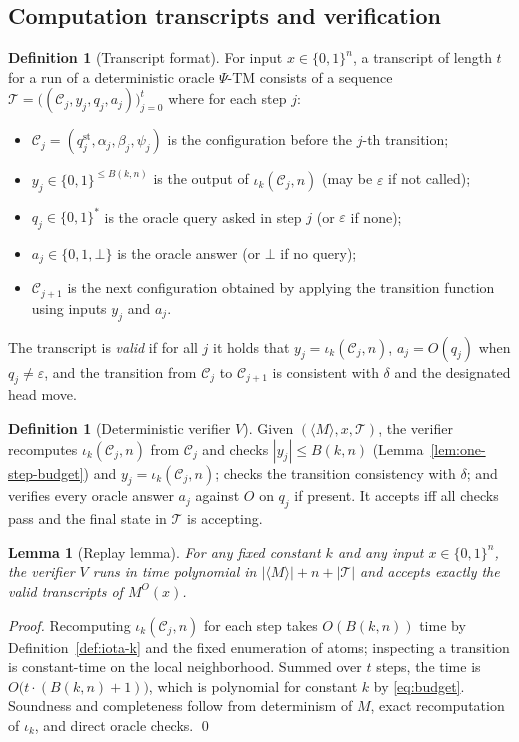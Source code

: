 \documentclass[11pt]{article}
\newtheorem{lemma}[theorem]{Lemma}
\theoremstyle{definition}
\newtheorem{definition}[theorem]{Definition}
\newcommand{\PSi}{\Psi}
\newcommand{\bits}{\{0,1\}}
\begin{document}
\subsection{Computation transcripts and verification}
\label{subsec:transcript-verifier}

\begin{definition}[Transcript format]
\label{def:transcript}
For input $x\in\bits^n$, a transcript of length $t$ for a run of a deterministic oracle $\PSi$-TM consists of a sequence $\mathcal{T}=\big((\mathcal{C}_j, y_j, q_j, a_j)\big)_{j=0}^{t}$ where for each step $j$:
\begin{itemize}
  \item $\mathcal{C}_j=(q_j^{\mathrm{st}},\alpha_j,\beta_j,\psi_j)$ is the configuration before the $j$-th transition;
  \item $y_j\in\bits^{\le B(k,n)}$ is the output of $\iota_k(\mathcal{C}_j,n)$ (may be $\varepsilon$ if not called);
  \item $q_j\in\bits^*$ is the oracle query asked in step $j$ (or $\varepsilon$ if none);
  \item $a_j\in\{0,1,\bot\}$ is the oracle answer (or $\bot$ if no query);
  \item $\mathcal{C}_{j+1}$ is the next configuration obtained by applying the transition function using inputs $y_j$ and $a_j$.
\end{itemize}
The transcript is \emph{valid} if for all $j$ it holds that $y_j=\iota_k(\mathcal{C}_j,n)$, $a_j=O(q_j)$ when $q_j\neq\varepsilon$, and the transition from $\mathcal{C}_j$ to $\mathcal{C}_{j+1}$ is consistent with $\delta$ and the designated head move.
\end{definition}

\begin{definition}[Deterministic verifier $V$]
\label{def:verifier}
Given $(\langle M\rangle,x,\mathcal{T})$, the verifier recomputes $\iota_k(\mathcal{C}_j,n)$ from $\mathcal{C}_j$ and checks $|y_j|\le B(k,n)$ (Lemma~\ref{lem:one-step-budget}) and $y_j=\iota_k(\mathcal{C}_j,n)$; checks the transition consistency with $\delta$; and verifies every oracle answer $a_j$ against $O$ on $q_j$ if present. It accepts iff all checks pass and the final state in $\mathcal{T}$ is accepting.
\end{definition}

\begin{lemma}[Replay lemma]
\label{lem:replay}
For any fixed constant $k$ and any input $x\in\bits^n$, the verifier $V$ runs in time polynomial in $|\langle M\rangle|+n+|\mathcal{T}|$ and accepts exactly the valid transcripts of $M^{O}(x)$.
\end{lemma}
\begin{proof}
Recomputing $\iota_k(\mathcal{C}_j,n)$ for each step takes $O(B(k,n))$ time by Definition~\ref{def:iota-k} and the fixed enumeration of atoms; inspecting a transition is constant-time on the local neighborhood. Summed over $t$ steps, the time is $O\big(t\cdot(B(k,n)+1)\big)$, which is polynomial for constant $k$ by \eqref{eq:budget}. Soundness and completeness follow from determinism of $M$, exact recomputation of $\iota_k$, and direct oracle checks. \qed
\end{proof}
\end{document}
